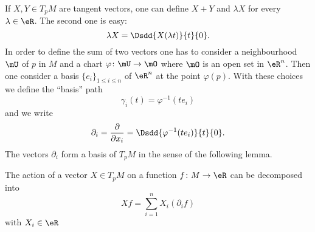 If \( X,Y\in T_pM\) are tangent vectors, one can define \( X+Y\) and \( \lambda X\) for every \( \lambda\in\eR\). The second one is easy:
\begin{equation}
	\lambda X=\Dsdd{ X(\lambda t) }{t}{0}.
\end{equation}
In order to define the sum of two vectors one has to consider a neighbourhood \( \mU\) of \( p\) in \( M\) and a chart \( \varphi\colon \mU\to \mO\) where \( \mO\) is an open set in \( \eR^n\). Then one consider a basis \( \{ e_i \}_{1\leq i\leq n}\) of \( \eR^n\) at the point \( \varphi(p)\). With these choices we define the ``basis'' path
\begin{equation}
	\gamma_i(t)=\varphi^{-1}(te_i)
\end{equation}
and we write
\begin{equation}
	\partial_i=\frac{ \partial  }{ \partial x_i }=\Dsdd{ \varphi^{-1}(te_i) }{t}{0}.
\end{equation}
The vectors \( \partial_i\) form a basis of \( T_pM\) in the sense of the following lemma.

\begin{lemma}       \label{LEMooXDESooHXzIJU}
	The action of a vector \( X\in T_pM\) on a function \( f\colon M\to \eR\) can be decomposed into
	\begin{equation}
		Xf=\sum_{i=1}^n X_i(\partial_if)
	\end{equation}
	with \( X_i\in\eR\)
\end{lemma}

